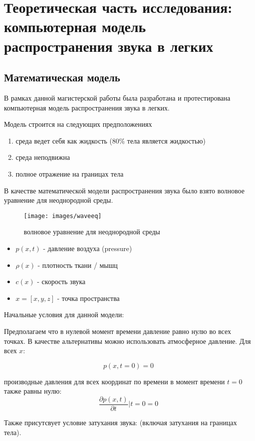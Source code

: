 \documentclass[../main.tex]{subfiles}
\begin{document}
\section{Теоретическая часть исследования: компьютерная модель распространения звука в легких}
\subsection{Математическая модель}
В рамках данной магистерской работы была разработана и протестирована компьютерная модель распространения звука в легких.

Модель строится на следующих предположениях
\begin{enumerate}
    \item среда ведет себя как жидкость (80\% тела является жидкостью)
    \item среда неподвижна
    \item полное отражение на границах тела
\end{enumerate}

В качестве математической модели распространения звука было взято волновое уравнение для неоднородной среды.

\begin{figure}[H]
\centering
\texttt{[image: images/waveeq]}
\caption{волновое уравнение для неоднородной среды}
\end{figure}

\begin{itemize}
    \item $p(x, t)$ - давление воздуха (pressure)
    \item $\rho(x)$ - плотность ткани / мышц
    \item $c(x)$ - скорость звука
    \item $x = [x, y, z]$ - точка пространства
\end{itemize}

Начальные условия для данной модели:

Предполагаем что в нулевой момент времени давление равно нулю во всех точках. В качестве альтернативы можно использовать атмосферное давление. Для всех $x$:

$$p(x, t=0) = 0$$

производные давления для всех координат по времени в момент времени $t=0$ также равны нулю:
$$\frac{\partial p(x, t)}{\partial t} \rvert t=0 = 0$$

Также присутсвует условие затухания звука: (включая затухания на границах тела).
\end{document}
